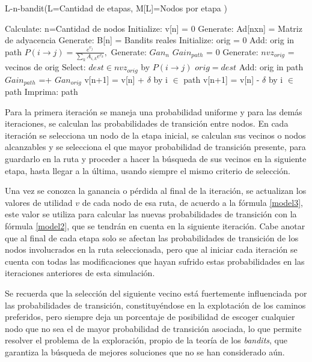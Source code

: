 \begin{algorithm} [h]
\caption{L-n-bandit(L=Cantidad de etapas, M[L]=Nodos por etapa )
} 
\label{Pseudo}
\begin{algorithmic}[1]
\STATE Calculate: n=Cantidad de nodos
\STATE Initialize: v[n] = 0
\STATE Generate: Ad[nxn] = Matriz de adyacencia
\STATE Generate: B[n] = Bandits reales
     \STATE Initialize: orig = 0
     \STATE Add: orig in path
     \STATE $P(i \to j) = \frac{e^{v_j}}{\sum_k A_{i,k} e^{v_k}},$
     \STATE Generate: $Gan_{n}$
     \STATE $Gain_{path}$ = 0
        \STATE Generate: $nvz_{orig}$ = vecinos de orig
        \STATE Select: $dest \in nvz_{orig}$  by $P(i \to j)$
        \STATE $orig = dest$
        \STATE Add: orig in path
        \STATE $Gain_{path}$ =+ $Gan_{orig}$
     \ENDFOR
        \STATE v[n+1] = v[n] + $\delta$ by i $\in$ path
     \ELSE
        \STATE v[n+1] = v[n] - $\delta$ by i $\in$ path   
     \ENDIF   
     \STATE Imprima: path
\ENDFOR
\end{algorithmic}
\end{algorithm}

Para la primera iteración se maneja una probabilidad uniforme y para las demás iteraciones, se calculan las probabilidades de transición entre nodos. En cada iteración se selecciona un nodo de la etapa inicial, se calculan sus vecinos o nodos alcanzables y se selecciona el que mayor probabilidad de transición presente, para guardarlo en la ruta y proceder a hacer la búsqueda de sus vecinos en la siguiente etapa, hasta llegar a la última, usando siempre el mismo criterio de selección.

Una vez se conozca la ganancia o pérdida al final de la iteración, se actualizan los valores de utilidad $v$ de cada nodo de esa ruta, de acuerdo a la fórmula \ref{model3}, este valor se utiliza para calcular las nuevas probabilidades de transición con la fórmula \ref{model2}, que se tendrán en cuenta en la siguiente iteración. Cabe anotar que al final de cada etapa solo se afectan las probabilidades de transición de los nodos involucrados en la ruta seleccionada, pero que al iniciar cada iteración se cuenta con todas las modificaciones que hayan sufrido estas probabilidades en las iteraciones anteriores de esta simulación.

Se recuerda que la selección del siguiente vecino está fuertemente influenciada por las probabilidades de transición, constituyéndose en la explotación de los caminos preferidos, pero siempre deja un porcentaje de posibilidad de escoger cualquier nodo que no sea el de mayor probabilidad de transición asociada, lo que permite resolver el problema de la exploración, propio de la teoría de los \textit{bandits}, que garantiza la búsqueda de mejores soluciones que no se han considerado aún.

